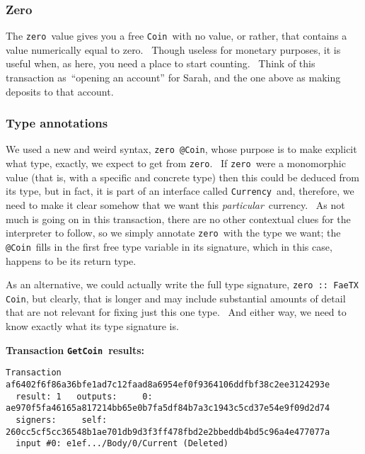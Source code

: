 \documentclass[11pt]{article}
\newcommand{\codeblock}[1]{\begin{mdframed}[
    backgroundcolor=header-color,
    linecolor=header-color,
    innertopmargin=10pt,
    ]{\texttt{#1}}\end{mdframed}}
\begin{document}
\subsubsection{Zero}
\vspace{5.5pt}

The \texttt{zero} value gives you a free \texttt{Coin} with no value, or rather, that contains a value numerically equal to zero.  Though useless for monetary purposes, it is useful when, as here, you need a place to start counting.  Think of this transaction as “opening an account” for Sarah, and the one above as making deposits to that account.

\subsubsection{Type annotations}
\vspace{5.5pt}

We used a new and weird syntax, \texttt{zero @Coin}, whose purpose is to make explicit what type, exactly, we expect to get from \texttt{zero}.  If \texttt{zero} were a monomorphic value (that is, with a specific and concrete type) then this could be deduced from its type, but in fact, it is part of an interface called \texttt{Currency} and, therefore, we need to make it clear somehow that we want this \textit{particular} currency.  As not much is going on in this transaction, there are no other contextual clues for the interpreter to follow, so we simply annotate \texttt{zero} with the type we want; the \texttt{@Coin} fills in the first free type variable in its signature, which in this case, happens to be its return type.


\vspace{11pt}

As an alternative, we could actually write the full type signature, \texttt{zero :: FaeTX Coin}, but clearly, that is longer and may include substantial amounts of detail that are not relevant for fixing just this one type.  And either way, we need to know exactly what its type signature is.


\vspace{11pt}

\textbf{Transaction }\textbf{\texttt{GetCoin}}\textbf{ results:}

\codeblock{Transaction af6402f6f86a36bfe1ad7c12faad8a6954ef0f9364106ddfbf38c2ee3124293e\newline
  result: 1\newline
  outputs:\newline
    0: ae970f5fa46165a817214bb65e0b7fa5df84b7a3c1943c5cd37e54e9f09d2d74\newline
  signers:\newline
    self: 260cc5cf5cc36548b1ae701db9d3f3ff478fbd2e2bbeddb4bd5c96a4e477077a\newline
  input \#0: e1ef...\slash{}Body\slash{}0\slash{}Current (Deleted)}
\end{document}
